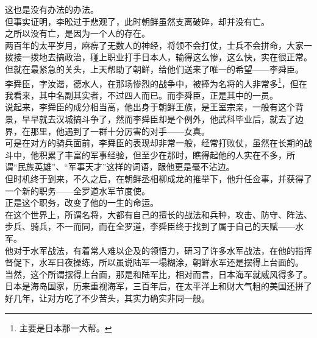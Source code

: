 \begin{multicols}{\theparacolNo}
这也是没有办法的办法。\\

但事实证明，李昖过于悲观了，此时朝鲜虽然支离破碎，却并没有亡。\\

之所以没有亡，是因为一个人的存在。\\

两百年的太平岁月，麻痹了无数人的神经，将领不会打仗，士兵不会拼命，大家一拨接一拨地去搞政治，碰上职业打手日本人，输得这么惨，这么快，实在很正常。\\

但就在最紧急的关头，上天帮助了朝鲜，给他们送来了唯一的希望——李舜臣。\\

李舜臣，字汝谐，德水人，在那场惨烈的战争中，被捧为名将的人非常多\footnote{主要是日本那一大帮。}，但在我看来，其中名副其实者，不过四人而已。而李舜臣，正是其中的一员。\\

说起来，李舜臣的成分相当高，他出身于朝鲜王族，是王室宗亲，一般有这个背景，早早就去汉城搞斗争了，然而李舜臣却是个例外，他武科毕业后，就去了边界，在那里，他遇到了一群十分厉害的对手——女真。\\

可是在对方的骑兵面前，李舜臣的表现却非常一般，经常打败仗，虽然在长期的战斗中，他积累了丰富的军事经验，但至少在那时，瞧得起他的人实在不多，所谓“民族英雄”、“军事天才”这样的词语，跟他更是毫不沾边。\\

但时机终于到来，不久之后，在朝鲜丞相柳成龙的推举下，他升任佥事，并获得了一个新的职务——全罗道水军节度使。\\

正是这个职务，改变了他的一生的命运。\\

在这个世界上，所谓名将，大都有自己的擅长的战法和兵种，攻击、防守、阵法、步兵、骑兵，不一而同，而在全罗道，李舜臣终于找到了属于自己的天赋——水军。\\

他对于水军战法，有着常人难以企及的领悟力，研习了许多水军战法，在他的指挥督促下，水军日夜操练，所以虽说陆军一塌糊涂，朝鲜水军还是摆得上台面的。\\

当然，这个所谓摆得上台面，那是和陆军比，相对而言，日本海军就威风得多了。\\

日本是海岛国家，历来重视海军，三百年后，在太平洋上和财大气粗的美国还拼了好几年，让对方吃了不少苦头，其实力确实非同一般。\\


\end{multicols}
